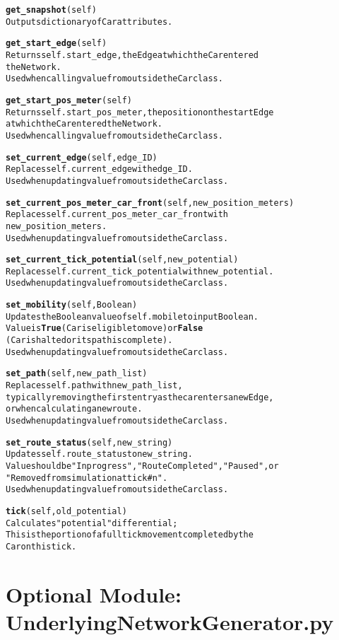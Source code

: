 \begin{alltt}
\textbf{get_snapshot}(self)
Outputs dictionary of Car attributes.

\textbf{get_start_edge}(self)
Returns self.start_edge, the Edge at which the Car entered 
the Network.
Used when calling value from outside the Car class.

\textbf{get_start_pos_meter}(self)
Returns self.start_pos_meter, the position on the start Edge 
at which the Car entered the Network.
Used when calling value from outside the Car class.

\textbf{set_current_edge}(self, edge_ID)
Replaces self.current_edge with edge_ID.
Used when updating value from outside the Car class.

\textbf{set_current_pos_meter_car_front}(self, new_position_meters)
Replaces self.current_pos_meter_car_front with 
new_position_meters.
Used when updating value from outside the Car class.

\textbf{set_current_tick_potential}(self, new_potential)
Replaces self.current_tick_potential with new_potential.
Used when updating value from outside the Car class.

\textbf{set_mobility}(self, Boolean)
Updates the Boolean value of self.mobile to input Boolean.
Value is \textbf{True} (Car is eligible to move) or \textbf{False}
(Car is halted or its path is complete).
Used when updating value from outside the Car class.

\textbf{set_path}(self, new_path_list)
Replaces self.path with new_path_list, 
typically removing the first entry as the car enters a new Edge, 
or when calculating a new route.
Used when updating value from outside the Car class.

\textbf{set_route_status}(self, new_string)
Updates self.route_status to new_string.
Value should be "In progress", "Route Completed", "Paused", or 
"Removed from simulation at tick #n".
Used when updating value from outside the Car class.

\textbf{tick}(self, old_potential)
Calculates "potential" differential;
This is the portion of a full tick movement completed by the 
Car on this tick.

\end{alltt}


\section{Optional Module:  \\ UnderlyingNetworkGenerator.py}

